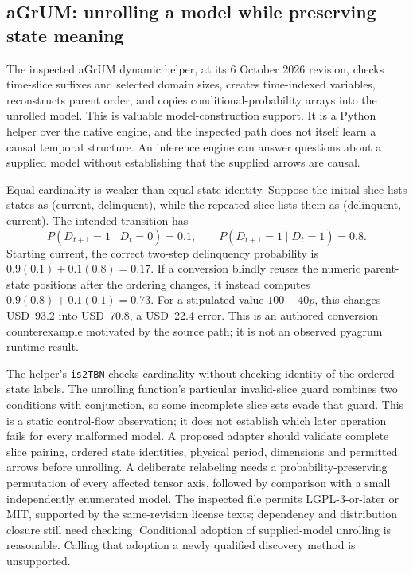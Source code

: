 \subsection{aGrUM: unrolling a model while preserving state meaning}

The inspected aGrUM dynamic helper, at its 6 October 2026 revision, checks
time-slice suffixes and selected domain sizes, creates time-indexed variables,
reconstructs parent order, and copies conditional-probability arrays into the
unrolled model. This is valuable model-construction support. It is a Python
helper over the native engine, and the inspected path does not itself learn
a causal temporal structure. An inference engine can answer questions about
a supplied model without establishing that the supplied arrows are causal.
\citep{exec16_ct_agrum}

Equal cardinality is weaker than equal state identity. Suppose the initial
slice lists states as (current, delinquent), while the repeated slice lists
them as (delinquent, current). The intended transition has
\[
 P(D_{t+1}=1\mid D_t=0)=0.1,\qquad
 P(D_{t+1}=1\mid D_t=1)=0.8.
\]
Starting current, the correct two-step delinquency probability is
$0.9(0.1)+0.1(0.8)=0.17$. If a conversion blindly reuses the numeric
parent-state positions after the ordering changes, it instead computes
$0.9(0.8)+0.1(0.1)=0.73$. For a stipulated value $100-40p$, this changes
USD~93.2 into USD~70.8, a USD~22.4 error. This is an authored conversion
counterexample motivated by the source path; it is not an observed pyagrum
runtime result.\citep{exec16_ct_oracle}

The helper's \texttt{is2TBN} checks cardinality without checking identity of
the ordered state labels. The unrolling function's particular invalid-slice
guard combines two conditions with conjunction, so some incomplete slice
sets evade that guard. This is a static control-flow observation; it does not
establish which later operation fails for every malformed model. A proposed
adapter should validate complete slice pairing, ordered state identities,
physical period, dimensions and permitted arrows before unrolling. A
deliberate relabeling needs a probability-preserving permutation of every
affected tensor axis, followed by comparison with a small independently
enumerated model. The inspected file permits LGPL-3-or-later or MIT, supported
by the same-revision license texts; dependency and distribution closure still
need checking. Conditional adoption of supplied-model unrolling is reasonable.
Calling that adoption a newly qualified discovery method is unsupported.
\citep{exec16_ct_agrum,exec16_ct_design}

